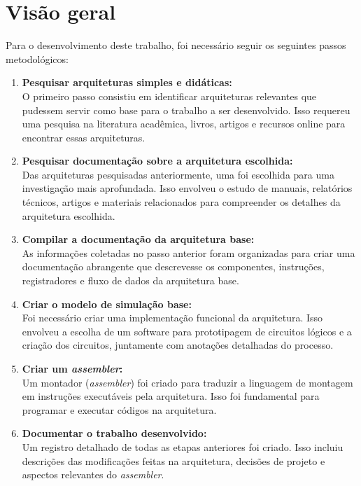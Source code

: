 \documentclass[
	12pt,				%
	openright,			%
	oneside,			%
	a4paper,			%
	english,			%
	french,				%
	spanish,			%
	brazil,				%
	]{abntex2}
\begin{document}
\section{Visão geral}
Para o desenvolvimento deste trabalho, foi necessário seguir os seguintes passos metodológicos:
\begin{enumerate}[label=\textbf{\arabic*.}]
    \item \textbf{Pesquisar arquiteturas simples e didáticas:} \\
    O primeiro passo consistiu em identificar arquiteturas relevantes que pudessem servir como base para o trabalho a ser desenvolvido. Isso requereu uma pesquisa na literatura acadêmica, livros, artigos e recursos online para encontrar essas arquiteturas.
    
    \item \textbf{Pesquisar documentação sobre a arquitetura escolhida:} \\
    Das arquiteturas pesquisadas anteriormente, uma foi escolhida para uma investigação mais aprofundada. Isso envolveu o estudo de manuais, relatórios técnicos, artigos e materiais relacionados para compreender os detalhes da arquitetura escolhida.
    
    \item \textbf{Compilar a documentação da arquitetura base:} \\
    As informações coletadas no passo anterior foram organizadas para criar uma documentação abrangente que descrevesse os componentes, instruções, registradores e fluxo de dados da arquitetura base.
    
    \item \textbf{Criar o modelo de simulação base:} \\
    Foi necessário criar uma implementação funcional da arquitetura. Isso envolveu a escolha de um software para prototipagem de circuitos lógicos e a criação dos circuitos, juntamente com anotações detalhadas do processo.
    
    \item \textbf{Criar um \textit{assembler}:} \\
    Um montador (\textit{assembler}) foi criado para traduzir a linguagem de montagem em instruções executáveis pela arquitetura. Isso foi fundamental para programar e executar códigos na arquitetura.
    
    \item \textbf{Documentar o trabalho desenvolvido:} \\
    Um registro detalhado de todas as etapas anteriores foi criado. Isso incluiu descrições das modificações feitas na arquitetura, decisões de projeto e aspectos relevantes do \textit{assembler}.


\end{enumerate}
\end{document}

